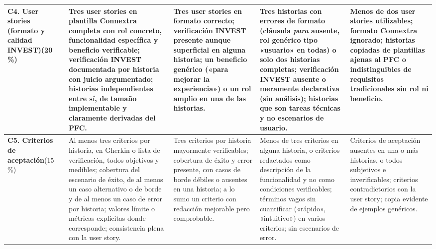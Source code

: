 \documentclass[11pt]{article}
\begin{document}
\begin{landscape}
{\begin{longtable}{|L{3.4cm}|L{4.7cm}|L{4.7cm}|L{4.7cm}|L{4.7cm}|}
\textbf{C4. User stories (formato y calidad INVEST)}\newline{}(20\,\%) &
Tres user stories en plantilla Connextra completa con rol concreto, funcionalidad específica y beneficio verificable; verificación INVEST documentada por historia con juicio argumentado; historias independientes entre sí, de tamaño implementable y claramente derivadas del PFC. &
Tres user stories en formato correcto; verificación INVEST presente aunque superficial en alguna historia; un beneficio genérico («para mejorar la experiencia») o un rol amplio en una de las historias. &
Tres historias con errores de formato (cláusula \textit{para} ausente, rol genérico tipo «usuario» en todas) o solo dos historias completas; verificación INVEST ausente o meramente declarativa (sin análisis); historias que son tareas técnicas y no escenarios de usuario. &
Menos de dos user stories utilizables; formato Connextra ignorado; historias copiadas de plantillas ajenas al PFC o indistinguibles de requisitos tradicionales sin rol ni beneficio.\\
\hline

\textbf{C5. Criterios de aceptación}\newline{}(15\,\%) &
Al menos tres criterios por historia, en Gherkin o lista de verificación, todos objetivos y medibles; cobertura del escenario de éxito, de al menos un caso alternativo o de borde y de al menos un caso de error por historia; valores límite o métricas explícitas donde corresponde; consistencia plena con la user story. &
Tres criterios por historia mayormente verificables; cobertura de éxito y error presente, con casos de borde débiles o ausentes en una historia; a lo sumo un criterio con redacción mejorable pero comprobable. &
Menos de tres criterios en alguna historia, o criterios redactados como descripción de la funcionalidad y no como condiciones verificables; términos vagos sin cuantificar («rápido», «intuitivo») en varios criterios; sin escenarios de error. &
Criterios de aceptación ausentes en una o más historias, o todos subjetivos e inverificables; criterios contradictorios con la user story; copia evidente de ejemplos genéricos.\\
\hline


\end{longtable}}
\end{landscape}
\end{document}
